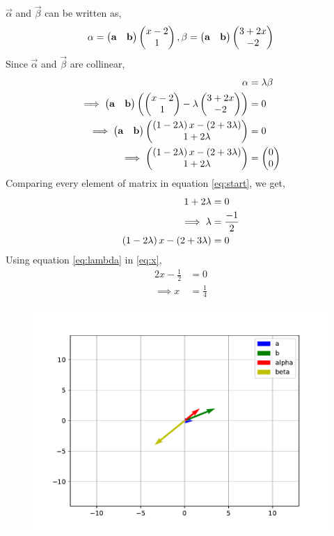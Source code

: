 \documentclass[journal,12pt,twocolumn]{IEEEtran}
\begin{document}
	\solution
$\vec{\alpha}$ and $\vec{\beta}$ can be written as,
\begin{align}
\mathbf{\alpha} = \begin{pmatrix} \mathbf{a} & \mathbf{b}\end{pmatrix} \begin{pmatrix}x-2 \\ 1\end{pmatrix} , \mathbf{\beta} = \begin{pmatrix} \mathbf{a} & \mathbf{b}\end{pmatrix} \begin{pmatrix}3+2x \\ -2\end{pmatrix}
\end{align}
Since $\vec{\alpha}$ and $\vec{\beta}$ are collinear,
\begin{align}
\mathbf{\alpha} &= \lambda \mathbf{\beta} \\
\implies \begin{pmatrix} \mathbf{a} & \mathbf{b}\end{pmatrix} \left(\begin{pmatrix}x-2 \\ 1\end{pmatrix} -\lambda \begin{pmatrix}3+2x \\ -2\end{pmatrix}\right) &= 0 \\
\implies \begin{pmatrix} \mathbf{a} & \mathbf{b}\end{pmatrix} \begin{pmatrix}\left(1-2\lambda\right)x - \left(2+3\lambda\right) \\ 1+2\lambda\end{pmatrix} &= 0 \\
\label{eq:start}
\implies \begin{pmatrix}\left(1-2\lambda\right)x - \left(2+3\lambda\right) \\ 1+2\lambda\end{pmatrix} &= \begin{pmatrix}0 \\ 0\end{pmatrix}
\end{align}
Comparing every element of matrix in equation \eqref{eq:start}, we get,
\begin{align}
1 + 2\lambda &= 0 \\
\label{eq:lambda}
\implies \lambda &= \frac{-1}{2} \\
\label{eq:x}
\left(1-2\lambda\right)x - \left(2+3\lambda\right) &= 0
\end{align}
Using equation \eqref{eq:lambda} in  \eqref{eq:x},
\begin{align}
2x - \frac{1}{2} &= 0 \\
\implies x &= \frac{1}{4}
\end{align}
\begin{figure}[!ht]
	\centering
	\includegraphics[width=\columnwidth]{figure/fig.pdf}
	\caption{}
	\label{fig:1}
\end{figure}
\end{document}
